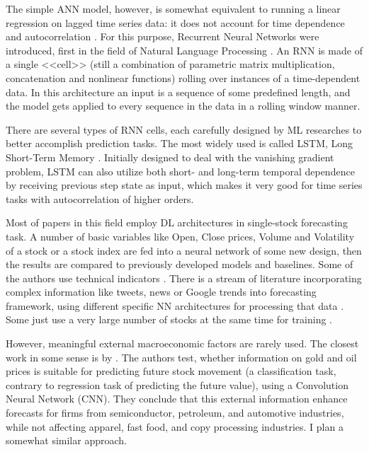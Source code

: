 \documentclass[stu]{apa7}
\begin{document}
The simple ANN model, however, is somewhat equivalent to running a linear regression on lagged time series data: it does not account for time dependence and autocorrelation \citep{torres_deep_2021}. For this purpose, Recurrent Neural Networks were introduced, first in the field of Natural Language Processing \citep{hewamalage_recurrent_2021}. An RNN is made of a single <<cell>> (still a combination of parametric matrix multiplication, concatenation and nonlinear functions) rolling over instances of a time-dependent data. In this architecture an input is a sequence of some predefined length, and the model gets applied to every sequence in the data in a rolling window manner.

There are several types of RNN cells, each carefully designed by ML researches to better accomplish prediction tasks. The most widely used is called LSTM, Long Short-Term Memory \citep{greff_lstm_2017}.
Initially designed to deal with the vanishing gradient problem, LSTM can also utilize both short- and long-term temporal dependence by receiving previous step state as input, which makes it very good for time series tasks with autocorrelation of higher orders.

Most of papers in this field employ DL architectures in single-stock forecasting task. A number of basic variables like Open, Close prices, Volume and Volatility of a stock or a stock index are fed into a neural network of some new design, then the results are compared to previously developed models and baselines. %
Some of the authors use technical indicators \citep[e.g.][]{nelson_stock_2017, chen_lstm-based_2015}. %
There is a stream of literature incorporating complex information like tweets, news or Google trends into forecasting framework, using different specific NN architectures for processing that data \citep{huang_using_2020, kordonis_stock_2016, hu_predicting_2018}. Some just use a very large number of stocks at the same time for training \citep{li_stock_2018}.

However, meaningful external macroeconomic factors are rarely used.
The closest work in some sense is by \citet{chen_constructing_2021}. The authors test, whether information on gold and oil prices is suitable for predicting future stock movement (a classification task, contrary to regression task of predicting the future value), using a Convolution Neural Network (CNN). They conclude that this external information enhance forecasts for firms from semiconductor, petroleum, and automotive industries, while not affecting apparel, fast food, and copy processing industries.
I plan a somewhat similar approach.
\end{document}
